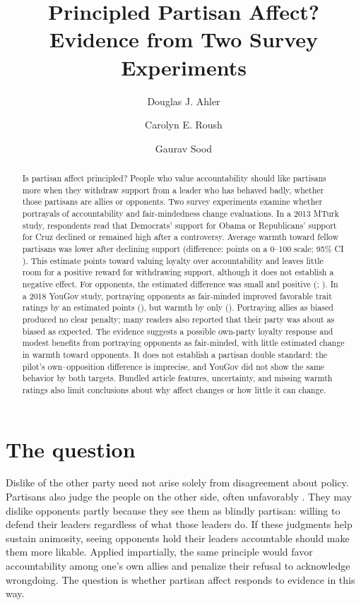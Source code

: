 \documentclass[11pt]{article}
\title{Principled Partisan Affect?\\Evidence from Two Survey Experiments}
\author{Douglas J. Ahler \and Carolyn E. Roush \and Gaurav Sood}
\date{}
\begin{document}
\maketitle
\begin{abstract}
\noindent Is partisan affect principled? People who value accountability should like partisans more when they withdraw support from a leader who has behaved badly, whether those partisans are allies or opponents. Two survey experiments examine whether portrayals of accountability and fair-mindedness change evaluations. In a 2013 MTurk study, respondents read that Democrats' support for Obama or Republicans' support for Cruz declined or remained high after a controversy. Average warmth toward fellow partisans was lower after declining support (difference: \MtInEstimate{} points on a 0--100 scale; 95\% CI \MtInCI{}). This estimate points toward valuing loyalty over accountability and leaves little room for a positive reward for withdrawing support, although it does not establish a negative effect. For opponents, the estimated difference was small and positive (\MtOutEstimate{}; \MtOutCI{}). In a 2018 YouGov study, portraying opponents as fair-minded improved favorable trait ratings by an estimated \YgOutTraitEstimate{} points (\YgOutTraitCI{}), but warmth by only \YgOutFtEstimate{} (\YgOutFtCI{}). Portraying allies as biased produced no clear penalty; many readers also reported that their party was about as biased as expected. The evidence suggests a possible own-party loyalty response and modest benefits from portraying opponents as fair-minded, with little estimated change in warmth toward opponents. It does not establish a partisan double standard: the pilot's own--opposition difference is imprecise, and YouGov did not show the same behavior by both targets. Bundled article features, uncertainty, and missing warmth ratings also limit conclusions about why affect changes or how little it can change.
\end{abstract}

\section{The question}
Dislike of the other party need not arise solely from disagreement about policy. Partisans also judge the people on the other side, often unfavorably \citep{iyengar2012}. They may dislike opponents partly because they see them as blindly partisan: willing to defend their leaders regardless of what those leaders do. If these judgments help sustain animosity, seeing opponents hold their leaders accountable should make them more likable. Applied impartially, the same principle would favor accountability among one's own allies and penalize their refusal to acknowledge wrongdoing. The question is whether partisan affect responds to evidence in this way.
\end{document}
